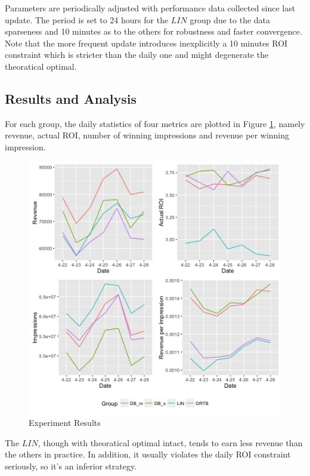 \documentclass[sigconf]{acmart}
\begin{document}
Parameters are periodically adjusted with performance data collected since last update.
The period is set to 24 hours for the $LIN$ group due to the data sparseness
    and 10 minutes as to the others for robustness and faster convergence.
Note that the more frequent update introduces inexplicitly a 10 minutes ROI constraint
    which is stricter than the daily one and might degenerate the theoratical optimal.

\subsection{Results and Analysis}

For each group, the daily statistics of four metrics are plotted in Figure \ref{Result},
    namely revenue, actual ROI, number of winning impressions and revenue per winning impression.

\begin{figure}[!h]
\centering
\includegraphics[width=1.0\linewidth]{./Result.jpg}
\caption{Experiment Results\label{Result}}
\end{figure}

The $LIN$, though with theoratical optimal intact, tends to earn less revenue than the others in practice.
In addition, it usually violates the daily ROI constraint seriously, so it's an inferior strategy.
\end{document}
